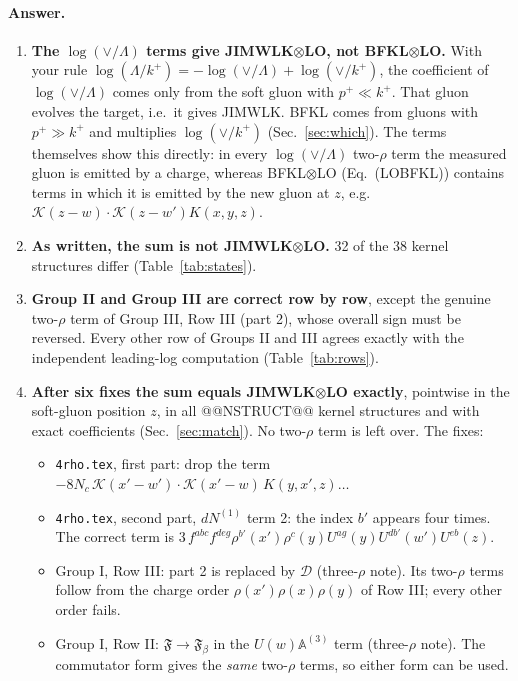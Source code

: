 \documentclass[10pt]{article}
\numberwithin{equation}{section}
\newcommand{\KK}{\mathcal K}
\begin{document}
\paragraph{Answer.}
\begin{enumerate}
\item \textbf{The $\log(\vee/\Lambda)$ terms give JIMWLK$\otimes$LO, not BFKL$\otimes$LO.} With your rule $\log(\Lambda/k^+)=-\log(\vee/\Lambda)+\log(\vee/k^+)$, the coefficient of $\log(\vee/\Lambda)$ comes only from the soft gluon with $p^+\ll k^+$. That gluon evolves the target, i.e.\ it gives JIMWLK. BFKL comes from gluons with $p^+\gg k^+$ and multiplies $\log(\vee/k^+)$ (Sec.~\ref{sec:which}). The terms themselves show this directly: in every $\log(\vee/\Lambda)$ two-$\rho$ term the measured gluon is emitted by a charge, whereas BFKL$\otimes$LO (Eq.~(LOBFKL)) contains terms in which it is emitted by the new gluon at $z$, e.g.\ $\KK(z-w)\cdot\KK(z-w')K(x,y,z)$.
\item \textbf{As written, the sum is not JIMWLK$\otimes$LO.} 32 of the 38 kernel structures differ (Table~\ref{tab:states}).
\item \textbf{Group II and Group III are correct row by row}, except the genuine two-$\rho$ term of Group III, Row III (part 2), whose overall sign must be reversed. Every other row of Groups II and III agrees exactly with the independent leading-log computation (Table~\ref{tab:rows}).
\item \textbf{After six fixes the sum equals JIMWLK$\otimes$LO exactly}, pointwise in the soft-gluon position $z$, in all @@NSTRUCT@@ kernel structures and with exact coefficients (Sec.~\ref{sec:match}). No two-$\rho$ term is left over. The fixes:
\begin{itemize}
\item[F1] \texttt{4rho.tex}, first part: drop the term $-8N_c\,\KK(x'-w')\cdot\KK(x'-w)\,K(y,x',z)\dots$
\item[F2] \texttt{4rho.tex}, second part, $dN^{(1)}$ term 2: the index $b'$ appears four times. The correct term is $3\,f^{abc}f^{deg}\rho^{b'}(x')\rho^c(y)U^{ag}(y)U^{db'}(w')U^{eb}(z)$.
\item[F3] Group I, Row III: part 2 is replaced by $\mathcal D$ (three-$\rho$ note). Its two-$\rho$ terms follow from the charge order $\rho(x')\rho(x)\rho(y)$ of Row III; every other order fails.
\item[F4] Group I, Row II: $\mathfrak F\to\mathfrak F_\beta$ in the $U(w)\mathbb A^{(3)}$ term (three-$\rho$ note). The commutator form gives the \emph{same} two-$\rho$ terms, so either form can be used.

\end{itemize}
\end{enumerate}
\end{document}
